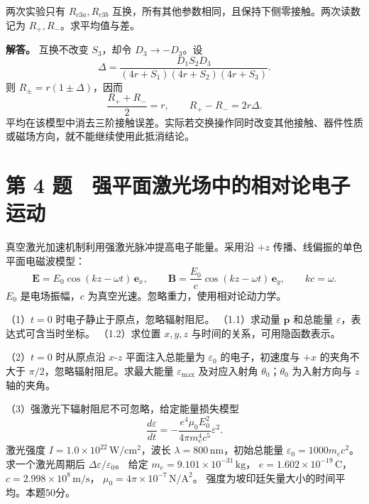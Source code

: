 \documentclass[12pt,a4paper,fontset=fandol]{ctexart}
\begin{document}
两次实验只有 \(R_{c3a},R_{c3b}\)
互换，所有其他参数相同，且保持下侧零接触。两次读数记为
\(R_+,R_-\)。求平均值与差。

\textbf{解答。} 互换不改变 \(S_3\)，却令 \(D_3\to-D_3\)。设 \[
\Delta=\frac{D_1S_2D_3}{(4r+S_1)(4r+S_2)(4r+S_3)}.
\] 则 \(R_\pm=r(1\pm\Delta)\)，因而 \[
\boxed{\frac{R_++R_-}{2}=r,\qquad
R_+-R_-=2r\Delta.}
\]
平均在该模型中消去三阶接触误差。实际若交换操作同时改变其他接触、器件性质或磁场方向，就不能继续使用此抵消结论。

\clearpage

\section{第 4
题　强平面激光场中的相对论电子运动}\label{ux7b2c-4-ux9898-ux5f3aux5e73ux9762ux6fc0ux5149ux573aux4e2dux7684ux76f8ux5bf9ux8bbaux7535ux5b50ux8fd0ux52a8}

真空激光加速机制利用强激光脉冲提高电子能量。采用沿 \(+z\)
传播、线偏振的单色平面电磁波模型： \[
\mathbf E=E_0\cos(kz-\omega t)\,\mathbf e_x,\qquad
\mathbf B=\frac{E_0}{c}\cos(kz-\omega t)\,\mathbf e_y,
\qquad kc=\omega.
\] \(E_0\) 是电场振幅，\(c\) 为真空光速。忽略重力，使用相对论动力学。

（1）\(t=0\) 时电子静止于原点，忽略辐射阻尼。 （1.1）求动量
\(\mathbf p\) 和总能量 \(\varepsilon\)，表达式可含当时坐标。
（1.2）求位置 \(x,y,z\) 与时间的关系，可用隐函数表示。

（2）\(t=0\) 时从原点沿 \(x\)-\(z\) 平面注入总能量为 \(\varepsilon_0\)
的电子，初速度与 \(+x\) 的夹角不大于 \(\pi/2\)，忽略辐射阻尼。求最大能量
\(\varepsilon_{\max}\) 及对应入射角 \(\theta_0\)；\(\theta_0\)
为入射方向与 \(z\) 轴的夹角。

（3）强激光下辐射阻尼不可忽略，给定能量损失模型 \[
\frac{d\varepsilon}{dt}
=-\frac{e^4\mu_0E_0^2}{4\pi m_e^4c^5}\varepsilon^2.
\] 激光强度 \(I=1.0\times10^{22}\,\mathrm{W/cm^2}\)，波长
\(\lambda=800\,\mathrm{nm}\)，初始总能量
\(\varepsilon_0=1000m_ec^2\)。求一个激光周期后
\(\Delta\varepsilon/\varepsilon_0\)。 给定
\(m_e=9.101\times10^{-31}\,\mathrm{kg}\)，
\(e=1.602\times10^{-19}\,\mathrm C\)，
\(c=2.998\times10^8\,\mathrm{m/s}\)，
\(\mu_0=4\pi\times10^{-7}\,\mathrm{N/A^2}\)。
强度为坡印廷矢量大小的时间平均。本题50分。
\end{document}
